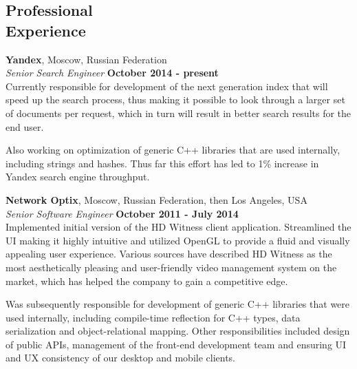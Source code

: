 \documentclass[margin,line]{CV}
\begin{document}
\begin{resume}
    
    
    \section{\mysidestyle Professional\\Experience}
    \textbf{Yandex}, Moscow, Russian Federation \vspace{2mm}\\\vspace{1mm}%
    \textsl{Senior Search Engineer} \hfill \textbf{October 2014 - present}\\ 
    Currently responsible for development of the next generation index that will speed up the search process, thus making it possible to look through a larger set of documents per request, which in turn will result in better search results for the end user.

    Also working on optimization of generic C++ libraries that are used internally, including strings and hashes. Thus far this effort has led to 1\% increase in Yandex search engine throughput.
    
    
    \textbf{Network Optix}, Moscow, Russian Federation, then Los Angeles, USA \vspace{2mm}\\\vspace{1mm}%
    \textsl{Senior Software Engineer} \hfill \textbf{October 2011 - July 2014}\\ 
    Implemented initial version of the HD Witness client application. Streamlined the UI making it highly intuitive and utilized OpenGL to provide a fluid and visually appealing user experience. Various sources have described HD Witness as the most aesthetically pleasing and user-friendly video management system on the market, which has helped the company to gain a competitive edge.
    
    Was subsequently responsible for development of generic C++ libraries that were used internally, including compile-time reflection for C++ types, data serialization and object-relational mapping. Other responsibilities included design of public APIs, management of the front-end development team and ensuring UI and UX consistency of our desktop and mobile clients.


\end{resume}
\end{document}
